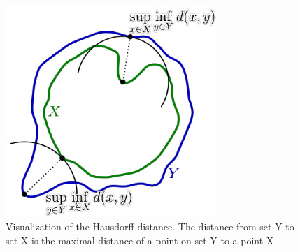 \begin{figure}[H]
\centering
\includegraphics[width=8cm]{chapters/06_hdm/images/hausdorff_distance.png}
\caption{Visualization of the Hausdorff distance. The distance from set Y to set X is the maximal distance of a point on set Y to a point X \cite{hausdorffdistanceimage}}
\label{hausdorff_distance}
\end{figure}

